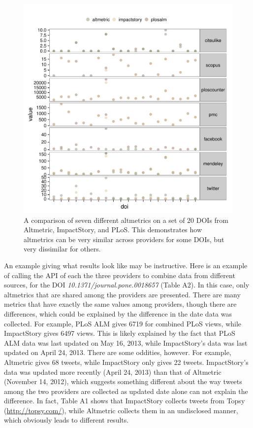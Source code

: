 \documentclass[letterpaper,superscriptaddress,showkeys,longbibliography]{revtex4-1}\usepackage{graphicx, color}
\newenvironment{knitrout}{}{} %
\begin{document}
\begin{knitrout}
\color{fgcolor}\begin{figure}[]


{\centering \includegraphics[width=.7\linewidth]{figure/dataconst2} 

}

\caption[A comparison of seven different altmetrics on a set of 20 DOIs from Altmetric, ImpactStory, and PLoS]{A comparison of seven different altmetrics on a set of 20 DOIs from Altmetric, ImpactStory, and PLoS. This demonstrates how altmetrics can be very similar across providers for some DOIs, but very dissimilar for others.\label{fig:dataconst2}}
\end{figure}


\end{knitrout}


An example giving what results look like may be instructive. Here is an example of calling the API of each the three providers to combine data from different sources, for the DOI \emph{10.1371/journal.pone.0018657} \cite{piwowar2011} (Table A2). In this case, only altmetrics that are shared among the providers are presented. There are many metrics that have exactly the same values among providers, though there are differences, which could be explained by the difference in the date data was collected. For example, PLoS ALM gives 6719 for combined PLoS views, while ImpactStory gives 6497 views. This is likely explained by the fact that PLoS ALM data was last updated on May 16, 2013, while ImpactStory's data was last updated on April 24, 2013. There are some oddities, however. For example, Altmetric gives 68 tweets, while ImpactStory only gives 22 tweets. ImpactStory's data was updated more recently (April 24, 2013) than that of Altmetric (November 14, 2012), which suggests something different about the way tweets among the two providers are collected as updated date alone can not explain the difference. In fact, Table A1 shows that ImpactStory collects tweets from Topsy (\url{http://topsy.com/}), while Altmetric collects them in an undisclosed manner, which obviously leads to different results.
\end{document}
